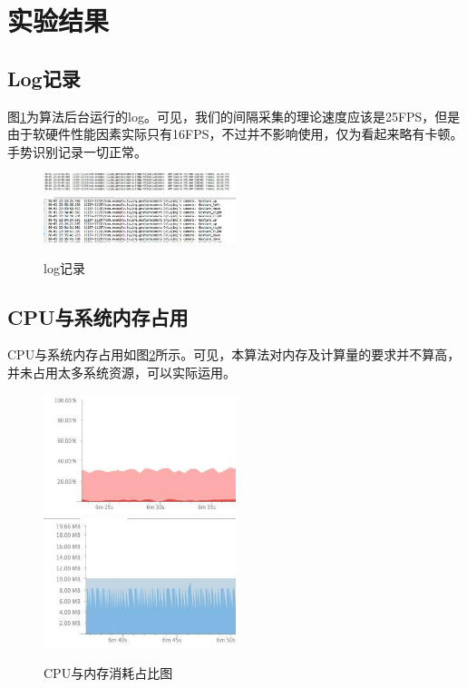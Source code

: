 \documentclass{XDBAthesis}
\begin{document}
\section{实验结果}

\subsection{Log记录}
图\ref{fg:1}为算法后台运行的log。可见，我们的间隔采集的理论速度应该是25FPS，但是由于软硬件性能因素实际只有16FPS，不过并不影响使用，仅为看起来略有卡顿。手势识别记录一切正常。
\begin{figure}[htb]
    \centering
    \includegraphics[width=0.5\textwidth ]{figure/opencvframe}%
    \includegraphics[width=0.5\textwidth ]{figure/gesture}
    \caption{log记录}
    \label{fg:1}
\end{figure}
\subsection{CPU与系统内存占用}
CPU与系统内存占用如图\ref{fg:2}所示。可见，本算法对内存及计算量的要求并不算高，并未占用太多系统资源，可以实际运用。
\begin{figure}[htb]
    \centering
    \includegraphics[width=0.5\textwidth ]{figure/cpu}%
    \includegraphics[width=0.5\textwidth ]{figure/memory}
    \caption{CPU与内存消耗占比图}
    \label{fg:2}
\end{figure}
\end{document}
